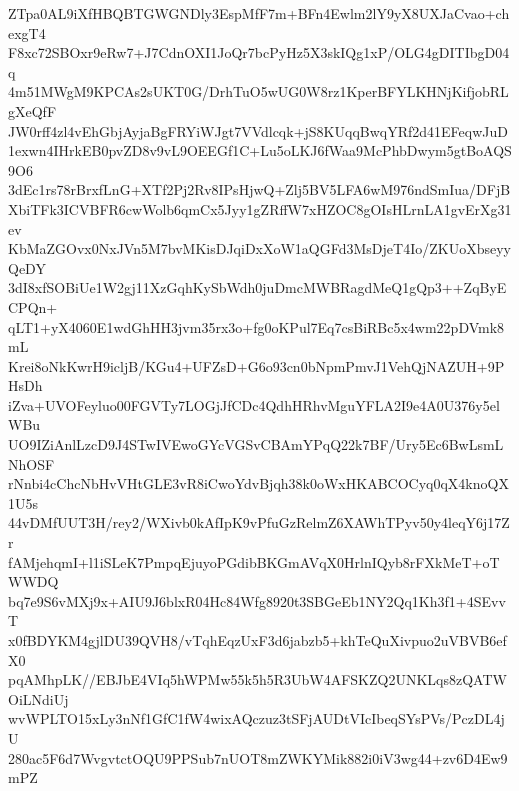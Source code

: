 ZTpa0AL9iXfHBQBTGWGNDly3EspMfF7m+BFn4Ewlm2lY9yX8UXJaCvao+chexgT4
F8xc72SBOxr9eRw7+J7CdnOXI1JoQr7bcPyHz5X3skIQg1xP/OLG4gDITIbgD04q
4m51MWgM9KPCAs2sUKT0G/DrhTuO5wUG0W8rz1KperBFYLKHNjKifjobRLgXeQfF
JW0rff4zl4vEhGbjAyjaBgFRYiWJgt7VVdlcqk+jS8KUqqBwqYRf2d41EFeqwJuD
1exwn4IHrkEB0pvZD8v9vL9OEEGf1C+Lu5oLKJ6fWaa9McPhbDwym5gtBoAQS9O6
3dEc1rs78rBrxfLnG+XTf2Pj2Rv8IPsHjwQ+Zlj5BV5LFA6wM976ndSmIua/DFjB
XbiTFk3ICVBFR6cwWolb6qmCx5Jyy1gZRffW7xHZOC8gOIsHLrnLA1gvErXg31ev
KbMaZGOvx0NxJVn5M7bvMKisDJqiDxXoW1aQGFd3MsDjeT4Io/ZKUoXbseyyQeDY
3dI8xfSOBiUe1W2gj11XzGqhKySbWdh0juDmcMWBRagdMeQ1gQp3++ZqByECPQn+
qLT1+yX4060E1wdGhHH3jvm35rx3o+fg0oKPul7Eq7csBiRBc5x4wm22pDVmk8mL
Krei8oNkKwrH9icljB/KGu4+UFZsD+G6o93cn0bNpmPmvJ1VehQjNAZUH+9PHsDh
iZva+UVOFeyluo00FGVTy7LOGjJfCDc4QdhHRhvMguYFLA2I9e4A0U376y5elWBu
UO9IZiAnlLzcD9J4STwIVEwoGYcVGSvCBAmYPqQ22k7BF/Ury5Ec6BwLsmLNhOSF
rNnbi4cChcNbHvVHtGLE3vR8iCwoYdvBjqh38k0oWxHKABCOCyq0qX4knoQX1U5s
44vDMfUUT3H/rey2/WXivb0kAfIpK9vPfuGzRelmZ6XAWhTPyv50y4leqY6j17Zr
fAMjehqmI+l1iSLeK7PmpqEjuyoPGdibBKGmAVqX0HrlnIQyb8rFXkMeT+oTWWDQ
bq7e9S6vMXj9x+AIU9J6blxR04Hc84Wfg8920t3SBGeEb1NY2Qq1Kh3f1+4SEvvT
x0fBDYKM4gjlDU39QVH8/vTqhEqzUxF3d6jabzb5+khTeQuXivpuo2uVBVB6efX0
pqAMhpLK//EBJbE4VIq5hWPMw55k5h5R3UbW4AFSKZQ2UNKLqs8zQATWOiLNdiUj
wvWPLTO15xLy3nNf1GfC1fW4wixAQczuz3tSFjAUDtVIcIbeqSYsPVs/PczDL4jU
280ac5F6d7WvgvtctOQU9PPSub7nUOT8mZWKYMik882i0iV3wg44+zv6D4Ew9mPZ
